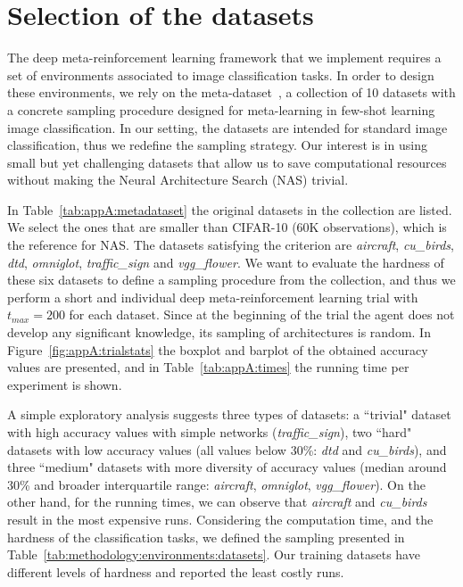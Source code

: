 


\section{Selection of the datasets}\label{app:datasets}

The deep meta-reinforcement learning framework that we implement requires a set of environments associated to image classification tasks. In order to design these environments, we rely on the meta-dataset~\citep{MetaDataset}, a collection of 10 datasets with a concrete sampling procedure designed for meta-learning in few-shot learning image classification. In our setting, the datasets are intended for standard image classification, thus we redefine the sampling strategy. Our interest is in using small but yet challenging datasets that allow us to save computational resources without making the Neural Architecture Search (NAS) trivial.

In Table~\ref{tab:appA:metadataset} the original datasets in the collection are listed. We select the ones that are smaller than CIFAR-10 (60K observations), which is the reference for NAS. The datasets satisfying the criterion are \textit{aircraft}, \textit{cu\_birds}, \textit{dtd}, \textit{omniglot}, \textit{traffic\_sign} and \textit{vgg\_flower}. We want to evaluate the hardness of these six datasets to define a sampling procedure from the collection, and thus we perform a short and individual deep meta-reinforcement learning trial with $t_{max}=200$ for each dataset. Since at the beginning of the trial the agent does not develop any significant knowledge, its sampling of architectures is random. In Figure~\ref{fig:appA:trialstats} the boxplot and barplot of the obtained accuracy values are presented, and in Table~\ref{tab:appA:times} the running time per experiment is shown. 


A simple exploratory analysis suggests three types of datasets: a ``trivial" dataset with high accuracy values with simple networks (\textit{traffic\_sign}), two ``hard" datasets with low accuracy values (all values below 30\%: \textit{dtd} and \textit{cu\_birds}), and three ``medium" datasets with more diversity of accuracy values (median around 30\% and broader interquartile range: \textit{aircraft}, \textit{omniglot}, \textit{vgg\_flower}). On the other hand, for the running times, we can observe that \textit{aircraft} and \textit{cu\_birds} result in the most expensive runs. Considering the computation time, and the hardness of the classification tasks, we defined the sampling presented in Table~\ref{tab:methodology:environments:datasets}. Our training datasets have different levels of hardness and reported the least costly runs.

